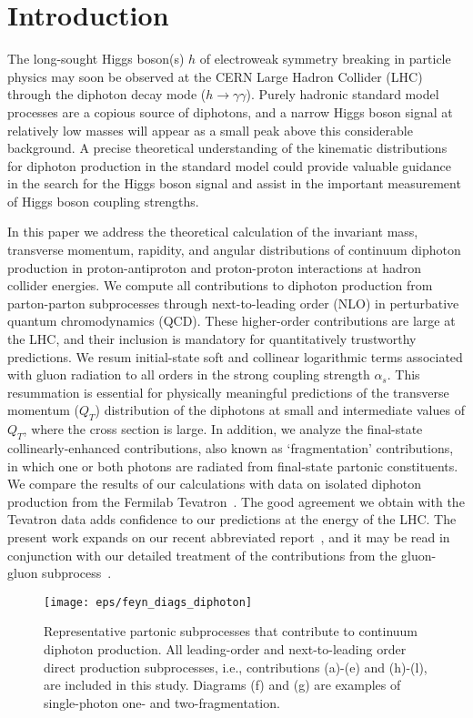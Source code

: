 \documentclass[12pt,english,aps,preprint,prd,letterpaper,fleqn,nofootinbib,showpacs,showkeys,tightenlines,floatfix]{revtex4}
\begin{document}
\maketitle

\section{Introduction}

The long-sought Higgs boson(s) $h$ of electroweak symmetry breaking
in particle physics may soon be observed at the CERN Large Hadron
Collider (LHC) through the diphoton decay mode ($h\rightarrow\gamma\gamma$).
Purely hadronic standard model processes are a copious source of diphotons,
and a narrow Higgs boson signal at relatively low masses will appear
as a small peak above this considerable background. A precise theoretical
understanding of the kinematic distributions for diphoton production
in the standard model could provide valuable guidance in the search
for the Higgs boson signal and assist in the important measurement 
of Higgs boson coupling strengths.

In this paper we address the theoretical calculation of the invariant
mass, transverse momentum, rapidity, and angular distributions of
continuum diphoton production in proton-antiproton and proton-proton
interactions at hadron collider energies. We compute all contributions
to diphoton production from parton-parton subprocesses through next-to-leading
order (NLO) in perturbative quantum chromodynamics (QCD). These higher-order
contributions are large at the LHC, and their inclusion is mandatory
for quantitatively trustworthy predictions. We resum initial-state
soft and collinear logarithmic terms associated with gluon radiation to all
orders in the strong coupling strength $\alpha_{s}$. This resummation
is essential for physically meaningful predictions of the transverse
momentum ($Q_{T}$) distribution of the diphotons at small and intermediate
values of $Q_{T}$, where the cross section is large. In addition,
we analyze the final-state collinearly-enhanced contributions, also
known as `fragmentation' contributions, in which one or both photons
are radiated from final-state partonic constituents. We compare the
results of our calculations with data on isolated diphoton production
from the Fermilab Tevatron~\cite{Acosta:2004sn}. The good agreement
we obtain with the Tevatron data adds confidence to our predictions
at the energy of the LHC. The present work expands on our recent abbreviated
report~\cite{Balazs:2006cc}, and it may be read in conjunction with
our detailed treatment of the contributions from the gluon-gluon subprocess~\cite{Nadolsky:2007ba}.
\begin{figure}
\texttt{[image: eps/feyn\_diags\_diphoton]}


\caption{Representative partonic subprocesses that contribute to continuum
diphoton production. All leading-order and next-to-leading order direct
production subprocesses, i.e., contributions (a)-(e) and (h)-(l),
are included in this study. Diagrams (f) and (g) are examples of single-photon
one- and two-fragmentation. \label{Fig:FeynDiag}}
\end{figure}
\end{document}
